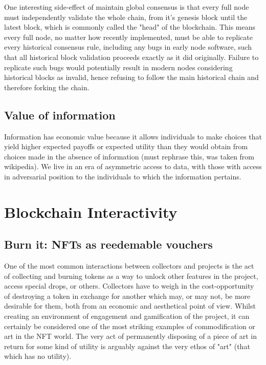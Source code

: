 One interesting side-effect of maintain global consensus is that every full node must independently validate the whole chain, from it's genesis block until the latest block, which is commonly called the "head" of the blockchain. This means every full node, no matter how recently implemented, must be able to replicate every historical consensus rule, including any bugs in early node software, such that all historical block validation proceeds exactly as it did originally. Failure to replicate such bugs would potentially result in modern nodes considering historical blocks as invalid, hence refusing to follow the main historical chain and therefore forking the chain.

\subsection{Value of information}

Information has economic value because it allows individuals to make choices that yield higher expected payoffs or expected utility than they would obtain from choices made in the absence of information (must rephrase this, was taken from wikipedia).
We live in an era of asymmetric access to data, with those with access in adversarial position to the individuals to which the information pertains. 


\section{Blockchain Interactivity}



\subsection{Burn it: NFTs as reedemable vouchers}

One of the most common interactions between collectors and projects is the act of collecting and burning tokens as a way to unlock other features in the project, access special drops, or others. Collectors have to weigh in the cost-opportunity of destroying a token in exchange for another which may, or may not, be more desirable for them, both from an economic and aesthetical point of view. Whilst creating an environment of engagement and gamification of the project, it can certainly be considered one of the most striking examples of commodification or art in the NFT world. The very act of permanently disposing of a piece of art in return for some kind of utility is arguably against the very ethos of "art" (that which has no utility).

